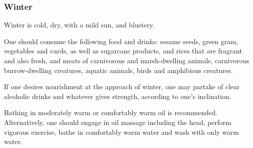 \begin{translation}
\subsubsection{Winter} 

\item[27cd] 
Winter is cold, dry, with a mild sun, and blustery.

\item[28--29] 
One should consume the following food and drinks: sesame seeds, green gram, vegetables and curds, as well as sugarcane products, and rices that are fragrant and also fresh, and meats of carnivorous and marsh-dwelling animals, carnivorous burrow-dwelling creatures, aquatic animals, birds and amphibious creatures.  

\item[30] 
If one desires nourishment at the approach of winter,  one may partake of clear alcoholic drinks and whatever gives strength, according to one’s inclination. 

\item[31--32ab] %
Bathing in moderately warm or comfortably warm oil is recommended. Alternatively, one should engage in oil massage including the head, perform vigorous exercise, bathe in comfortably warm water and wash with only warm water. 


\end{translation}
